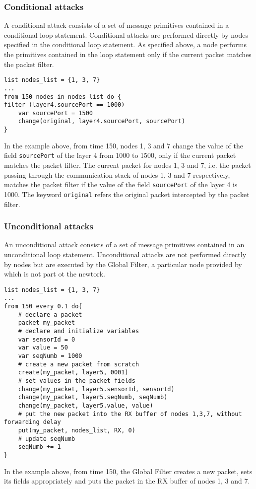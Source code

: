 \subsubsection{Conditional attacks}
A conditional attack consists of a set of message primitives contained in a conditional loop statement. Conditional attacks are performed directly by nodes specified in the conditional loop statement. As specified above, a node performs the primitives contained in the loop statement only if the current packet matches the packet filter.
%
\begin{lstlisting}[language={adl}]
list nodes_list = {1, 3, 7}
...
from 150 nodes in nodes_list do {
filter (layer4.sourcePort == 1000)    
    var sourcePort = 1500
    change(original, layer4.sourcePort, sourcePort)
}
\end{lstlisting}
%
In the example above, from time 150, nodes 1, 3 and 7 change the value of the field \texttt{sourcePort} of the layer 4 from 1000 to 1500, only if the current packet matches the packet filter. The current packet for nodes 1, 3 and 7, i.e. the packet passing through the communication stack of nodes 1, 3 and 7 respectively, matches the packet filter if the value of the field \texttt{sourcePort} of the layer 4 is 1000. 
The keyword \texttt{original} refers the original packet intercepted by the packet filter.

\subsubsection{Unconditional attacks}
An unconditional attack consists of a set of message primitives contained in an unconditional loop statement. Unconditional attacks are not performed directly by nodes but are executed by the Global Filter, a particular node provided by \asf which is not part ot the newtork.
%
\begin{lstlisting}[language={adl}]
list nodes_list = {1, 3, 7}
...
from 150 every 0.1 do{
    # declare a packet
    packet my_packet
    # declare and initialize variables
    var sensorId = 0
    var value = 50
    var seqNumb = 1000
    # create a new packet from scratch
    create(my_packet, layer5, 0001)
    # set values in the packet fields 
    change(my_packet, layer5.sensorId, sensorId)
    change(my_packet, layer5.seqNumb, seqNumb)
    change(my_packet, layer5.value, value)
    # put the new packet into the RX buffer of nodes 1,3,7, without forwarding delay
    put(my_packet, nodes_list, RX, 0)
    # update seqNumb
    seqNumb += 1
}
\end{lstlisting}
%
In the example above, from time 150, the Global Filter creates a new packet, sets its fields appropriately and puts the packet in the RX buffer of nodes 1, 3 and 7.

